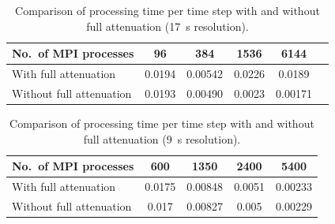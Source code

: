 \begin{table}
\centering
  \caption[Processing time with and without full attenutation at 17~s resolution]
    {\small{Comparison of processing time per time step with and without
      full attenuation (17~s resolution).}}
\label{tbl:comp256}
    \begin{tabular}{lccccc}
	  No.\ of MPI processes & 96 & 384 & 1536 & 6144 		       		 \\
    \midrule
	  With full attenuation & 0.0194 &0.00542 & 0.0226 & 0.0189 \\
    Without full attenuation & 0.0193 & 0.00490 & 0.0023 & 0.00171		       		 \\
    \end{tabular}
 \end{table}

 \begin{table}
\centering
   \caption[Processing time with and without full attenuation at 9~s resolution]
   {\small{Comparison of processing time per time step with and without
      full attenuation (9~s resolution).}}
\label{tbl:comp480}
     \begin{tabular}{lcccc}
	  No.\ of MPI processes & 600 & 1350 & 2400 & 5400 		       		 \\
    \midrule
	  With full attenuation & 0.0175 &0.00848 & 0.0051 & 0.00233 \\
    Without full attenuation & 0.017 & 0.00827 & 0.005 & 0.00229	       		 \\
    \end{tabular}
 \end{table}

